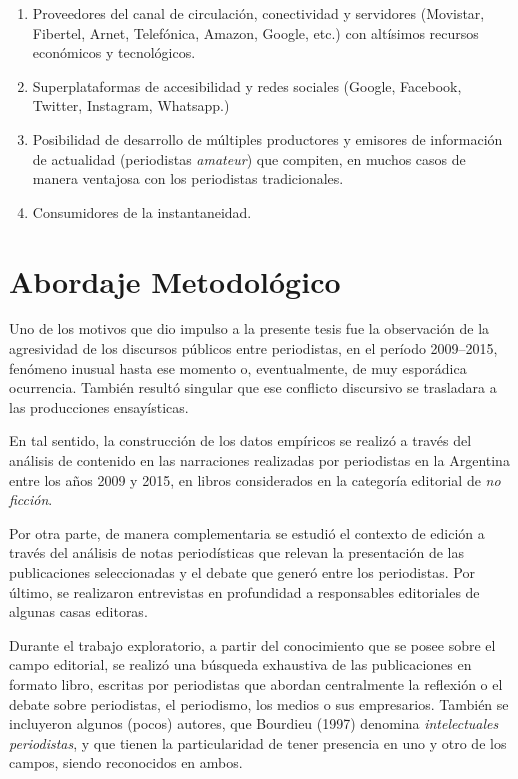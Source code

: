 \begin{enumerate}
	\begin{enumerate} [label=\alph*.]
		\item Proveedores del canal de circulación, conectividad y servidores (Movistar, Fibertel, Arnet, Telefónica, Amazon, Google, etc.) con altísimos recursos económicos y tecnológicos.
		\item Superplataformas de accesibilidad y redes sociales (Google, Facebook, Twitter, Instagram, Whatsapp.)
		\item Posibilidad de desarrollo de múltiples productores y emisores de información de actualidad (periodistas \emph{amateur}) que compiten, en muchos casos de manera ventajosa con los periodistas tradicionales.
		\item Consumidores de la instantaneidad.
	\end{enumerate}
\end{enumerate}


\section {Abordaje Metodológico}

Uno de los motivos que dio impulso a la presente tesis fue la observación de la agresividad de los discursos públicos entre periodistas, en el período 2009--2015, fenómeno inusual hasta ese momento o, eventualmente, de muy esporádica ocurrencia. También resultó singular que ese conflicto discursivo se trasladara a las producciones ensayísticas.

En tal sentido, la construcción de los datos empíricos se realizó a través del análisis de contenido en las narraciones realizadas por periodistas en la Argentina entre los años 2009 y 2015, en libros considerados en la categoría editorial de \emph{no ficción}.

Por otra parte, de manera complementaria se estudió el contexto de edición a través del análisis de notas periodísticas que relevan la presentación de las publicaciones seleccionadas y el debate que generó entre los periodistas. Por último, se realizaron entrevistas en profundidad a responsables editoriales de algunas casas editoras.

Durante el trabajo exploratorio, a partir del conocimiento que se posee sobre el campo editorial, se realizó una búsqueda exhaustiva de las publicaciones en formato libro, escritas por periodistas que abordan centralmente la reflexión o el debate sobre periodistas, el periodismo, los medios o sus empresarios. También se incluyeron algunos (pocos) autores, que Bourdieu (1997) denomina \emph{intelectuales periodistas}, y que tienen la particularidad de tener presencia en uno y otro de los campos, siendo reconocidos en ambos.

